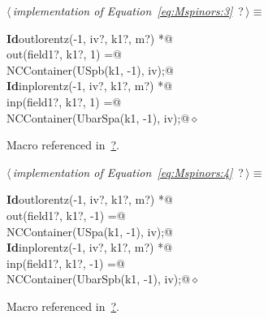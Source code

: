 \documentclass[a4paper,12pt]{amsart}
\renewcommand{\NWtarget}[2]{\hypertarget{#1}{#2}}
\renewcommand{\NWlink}[2]{\hyperlink{#1}{#2}}
\renewcommand{\NWtxtMacroRefIn}{Macro referenced in}
\renewcommand{\NWsep}{${\diamond}$}
\begin{document}
\begin{flushleft} \small
\begin{minipage}{\linewidth}\label{scrap16}\raggedright\small
\NWtarget{nuweb?}{} $\langle\,${\it implementation of Equation~\eqref{eq:Mspinors:3}}\nobreak\ {\footnotesize {?}}$\,\rangle\equiv$
\vspace{-1ex}
\begin{list}{}{} \item
\mbox{}\verb@@\hbox{\sffamily\bfseries Id}\verb@ outlorentz(-1, iv?, k1?, m?) *@\\
\mbox{}\verb@      out(field1?, k1?,  1) =@\\
\mbox{}\verb@   NCContainer(USpb(k1, -1), iv);@\\
\mbox{}\verb@@\hbox{\sffamily\bfseries Id}\verb@ inplorentz(-1, iv?, k1?, m?) *@\\
\mbox{}\verb@      inp(field1?, k1?,  1) =@\\
\mbox{}\verb@   NCContainer(UbarSpa(k1, -1), iv);@{\NWsep}
\end{list}
\vspace{-1.5ex}
\footnotesize
\begin{list}{}{\setlength{\itemsep}{-\parsep}\setlength{\itemindent}{-\leftmargin}}
\item \NWtxtMacroRefIn\ \NWlink{nuweb?}{?}.

\item{}
\end{list}
\end{minipage}\vspace{4ex}
\end{flushleft}
\begin{flushleft} \small
\begin{minipage}{\linewidth}\label{scrap17}\raggedright\small
\NWtarget{nuweb?}{} $\langle\,${\it implementation of Equation~\eqref{eq:Mspinors:4}}\nobreak\ {\footnotesize {?}}$\,\rangle\equiv$
\vspace{-1ex}
\begin{list}{}{} \item
\mbox{}\verb@@\hbox{\sffamily\bfseries Id}\verb@ outlorentz(-1, iv?, k1?, m?) *@\\
\mbox{}\verb@      out(field1?, k1?, -1) =@\\
\mbox{}\verb@   NCContainer(USpa(k1, -1), iv);@\\
\mbox{}\verb@@\hbox{\sffamily\bfseries Id}\verb@ inplorentz(-1, iv?, k1?, m?) *@\\
\mbox{}\verb@      inp(field1?, k1?, -1) =@\\
\mbox{}\verb@   NCContainer(UbarSpb(k1, -1), iv);@{\NWsep}
\end{list}
\vspace{-1.5ex}
\footnotesize
\begin{list}{}{\setlength{\itemsep}{-\parsep}\setlength{\itemindent}{-\leftmargin}}
\item \NWtxtMacroRefIn\ \NWlink{nuweb?}{?}.

\item{}
\end{list}
\end{minipage}\vspace{4ex}
\end{flushleft}
\end{document}
